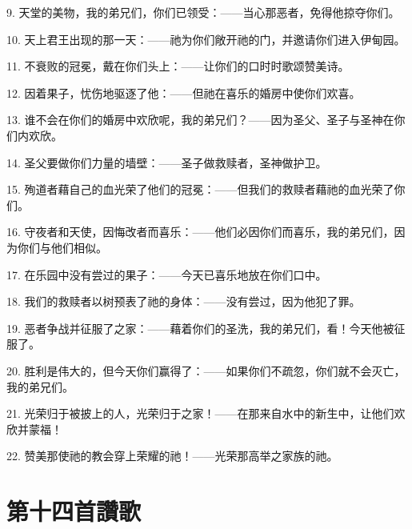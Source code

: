9. 天堂的美物，我的弟兄们，你们已领受：——当心那恶者，免得他掠夺你们。\par

10. 天上君王出现的那一天：——祂为你们敞开祂的门，并邀请你们进入伊甸园。\par

11. 不衰败的冠冕，戴在你们头上：——让你们的口时时歌颂赞美诗。\par

12. 因着果子，忧伤地驱逐了他：——但祂在喜乐的婚房中使你们欢喜。\par

13. 谁不会在你们的婚房中欢欣呢，我的弟兄们？——因为圣父、圣子与圣神在你们内欢欣。\par

14. 圣父要做你们力量的墙壁：——圣子做救赎者，圣神做护卫。\par

15. 殉道者藉自己的血光荣了他们的冠冕：——但我们的救赎者藉祂的血光荣了你们。\par

16. 守夜者和天使，因悔改者而喜乐：——他们必因你们而喜乐，我的弟兄们，因为你们与他们相似。\par

17. 在乐园中没有尝过的果子：——今天已喜乐地放在你们口中。\par

18. 我们的救赎者以树预表了祂的身体：——没有尝过，因为他犯了罪。\par

19. 恶者争战并征服了之家：——藉着你们的圣洗，我的弟兄们，看！今天他被征服了。\par

20. 胜利是伟大的，但今天你们赢得了：——如果你们不疏忽，你们就不会灭亡，我的弟兄们。\par

21. 光荣归于被披上的人，光荣归于之家！——在那来自水中的新生中，让他们欢欣并蒙福！\par

22. 赞美那使祂的教会穿上荣耀的祂！——光荣那高举之家族的祂。\par


\section{第十四首讚歌}

